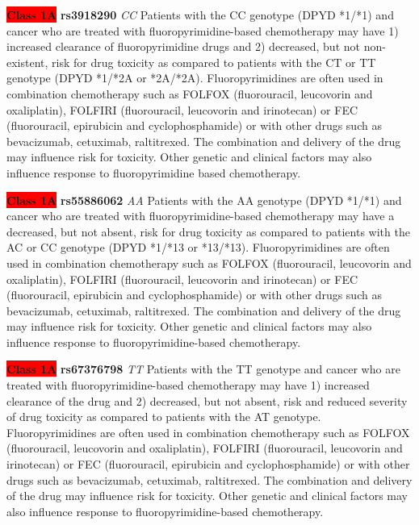 \documentclass{report}
\begin{document}
\textbf{\colorbox{red} {Class 1A}} \textbf{ rs3918290 } \textit{ CC }
Patients with the CC genotype (DPYD *1/*1) and cancer who are treated with fluoropyrimidine-based chemotherapy may have 1) increased clearance of fluoropyrimidine drugs and 2) decreased, but not non-existent, risk for drug toxicity as compared to patients with the CT or TT genotype (DPYD *1/*2A or *2A/*2A). Fluoropyrimidines are often used in combination chemotherapy such as FOLFOX (fluorouracil, leucovorin and oxaliplatin), FOLFIRI (fluorouracil,  leucovorin and irinotecan) or FEC (fluorouracil, epirubicin and cyclophosphamide) or with other drugs such as bevacizumab, cetuximab, raltitrexed. The combination and delivery of the drug may influence risk for toxicity. Other genetic and clinical factors may also influence response to fluoropyrimidine based chemotherapy.\newline

\textbf{\colorbox{red} {Class 1A}} \textbf{ rs55886062 } \textit{ AA }
Patients with the AA genotype (DPYD *1/*1) and cancer who are treated with fluoropyrimidine-based chemotherapy may have a decreased, but not absent, risk for drug toxicity as compared to patients with the AC or CC genotype (DPYD *1/*13 or *13/*13). Fluoropyrimidines are often used in combination chemotherapy such as FOLFOX (fluorouracil, leucovorin and oxaliplatin), FOLFIRI (fluorouracil, leucovorin and irinotecan) or FEC (fluorouracil, epirubicin and cyclophosphamide) or with other drugs such as bevacizumab, cetuximab, raltitrexed. The combination and delivery of the drug may influence risk for toxicity. Other genetic and clinical factors may also influence response to fluoropyrimidine-based chemotherapy.\newline

\textbf{\colorbox{red} {Class 1A}} \textbf{ rs67376798 } \textit{ TT }
Patients with the TT genotype and cancer who are treated with fluoropyrimidine-based chemotherapy may have 1) increased clearance of the drug and 2) decreased, but not absent, risk and reduced severity of drug toxicity as compared to patients with the AT genotype. Fluoropyrimidines are often used in combination chemotherapy such as FOLFOX (fluorouracil, leucovorin and oxaliplatin), FOLFIRI (fluorouracil, leucovorin and irinotecan) or FEC (fluorouracil, epirubicin and cyclophosphamide) or with other drugs such as bevacizumab, cetuximab, raltitrexed. The combination and delivery of the drug may influence risk for toxicity. Other genetic and clinical factors may also influence response to fluoropyrimidine-based chemotherapy.\newline
\end{document}
